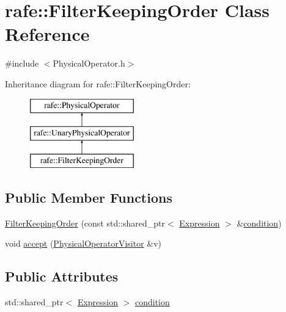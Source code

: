 \hypertarget{classrafe_1_1_filter_keeping_order}{\section{rafe\+:\+:Filter\+Keeping\+Order Class Reference}
\label{classrafe_1_1_filter_keeping_order}
}


{\ttfamily \#include $<$Physical\+Operator.\+h$>$}

Inheritance diagram for rafe\+:\+:Filter\+Keeping\+Order\+:\begin{figure}[H]
\begin{center}
\leavevmode
\includegraphics[height=3.000000cm]{classrafe_1_1_filter_keeping_order}
\end{center}
\end{figure}
\subsection*{Public Member Functions}
\begin{DoxyCompactItemize}
\item 
\hyperlink{classrafe_1_1_filter_keeping_order_a898792d39b2f5c7870111f859aecf0a4}{Filter\+Keeping\+Order} (const std\+::shared\+\_\+ptr$<$ \hyperlink{classrafe_1_1_expression}{Expression} $>$ \&\hyperlink{classrafe_1_1_filter_keeping_order_a94eced2ee1d9bcd744315548476fd292}{condition})
\item 
void \hyperlink{classrafe_1_1_filter_keeping_order_afde88521596d848cde18c0468aeb6062}{accept} (\hyperlink{classrafe_1_1_physical_operator_visitor}{Physical\+Operator\+Visitor} \&v)
\end{DoxyCompactItemize}
\subsection*{Public Attributes}
\begin{DoxyCompactItemize}
\item 
std\+::shared\+\_\+ptr$<$ \hyperlink{classrafe_1_1_expression}{Expression} $>$ \hyperlink{classrafe_1_1_filter_keeping_order_a94eced2ee1d9bcd744315548476fd292}{condition}
\end{DoxyCompactItemize}



